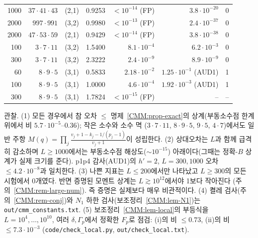 \begin{center}
\begin{tabular}{rrrrrrr}
1000 & $37\cdot41\cdot43$ & (2,1) & 0.9253 & $<10^{-14}$ (FP) & $3.8\cdot10^{-20}$ & 0\\
2000 & $997\cdot991$ & (3,2) & 0.9980 & $<10^{-13}$ (FP) & $2.4\cdot10^{-37}$ & 0\\
2000 & $47\cdot53\cdot59$ & (2,1) & 0.9429 & $<10^{-14}$ (FP) & $3.8\cdot10^{-38}$ & 0\\
\midrule
100 & $3\cdot7\cdot11$ & (3,2) & 1.5400 & $8.1\cdot10^{-4}$ & $6.2\cdot10^{-3}$ & 0\\
300 & $3\cdot7\cdot11$ & (3,2) & 2.3222 & $2.4\cdot10^{-9}$ & $8.9\cdot10^{-9}$ & 0\\
60 & $8\cdot9\cdot5$ & (3,1) & 0.5833 & $2.18\cdot10^{-2}$ & $1.25\cdot10^{-1}$ (AUD1) & 1\\
100 & $8\cdot9\cdot5$ & (3,1) & 1.0000 & $4.6\cdot10^{-4}$ & $1.92\cdot10^{-3}$ (AUD1) & 1\\
300 & $8\cdot9\cdot5$ & (3,1) & 1.7824 & $<10^{-15}$ (FP) & -- & --\\
\bottomrule
\end{tabular}
\end{center}
관찰. (1) 모든 경우에서 참 오차 $\le$ 명제~\ref{CMM:prop-exact}의 상계(부동소수점 한계 위에서 비 $5.7\cdot10^{-5}$--$0.36$); 작은 소수와 소수 멱
($3\cdot7\cdot11$, $8\cdot9\cdot5$, $9\cdot5$, $4\cdot7$)에서도 일반 주항 $M(q)=\prod_j\frac{v_j+1-k_j-1/(p_j-1)}{v_j+1}$이 성립한다.
(2) 상대오차는 $L$과 함께 급격히 감소하며 $L\ge1000$에서는 부동소수점 해상도($\sim10^{-15}$) 아래이다(그때는 정확-$B$ 상계가 실제 크기를 준다).
p1p4 감사(AUD1)의 $h'=2$, $L=300,1000$ 오차 $\le4.2\cdot10^{-8}$과 일치한다.
(3) 나쁜 지표는 $L\le200$에서만 나타났고 $L\ge300$의 모든 시험에서 $0$개였다. 반면 증명된 모멘트 상계는 $L\gtrsim10^{12}$에서야 1보다 작아진다
(주의~\ref{CMM:rem-large-num}). 즉 증명은 실제보다 매우 비관적이다.
(4) 켤레 검사(주의~\ref{CMM:rem-conj})와 $N_1$ 하한 검사(보조정리~\ref{CMM:lem-N1})는 \texttt{out/cmm\_constants.txt}.
(5) 보조정리~\ref{CMM:lem-local}의 부등식을 $L=10^4,\dots,10^{10}$, 여러 $\delta,\Gamma_p$에서 정확한 $F_p$로 점검: (i)의 비 $\le0.73$, (ii)의 비 $\le7.3\cdot10^{-3}$
(\texttt{code/check\_local.py}, \texttt{out/check\_local.txt}).

